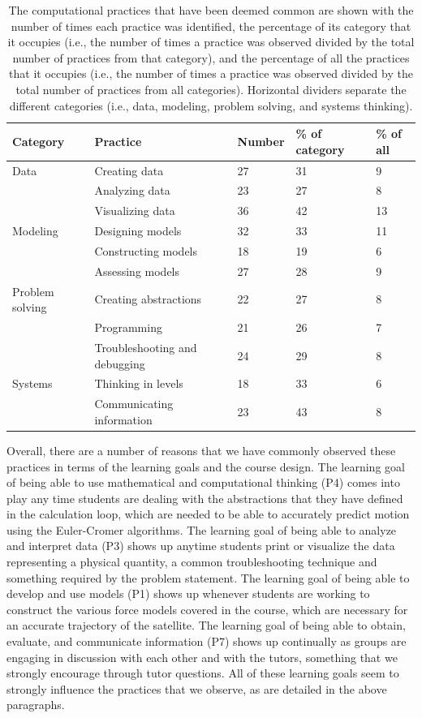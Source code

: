\documentclass{msuphddissertation}
\begin{document}
\begin{doublespace}
\begin{table}[hb]\centering
\begin{tabular}{lllll}\hline\hline
Category & Practice & Number & \% of category & \% of all\\\hline
Data & Creating data & 27 & 31 & 9 \\
 & Analyzing data & 23 & 27 & 8 \\
 & Visualizing data & 36 & 42 & 13 \\\hline
Modeling & Designing models & 32 & 33 & 11 \\
 & Constructing models & 18 & 19 & 6 \\
 & Assessing models & 27 & 28 & 9\\\hline
Problem solving & Creating abstractions & 22 & 27 & 8 \\
 & Programming & 21 & 26 & 7 \\
 & Troubleshooting and debugging & 24 & 29 & 8 \\\hline
Systems & Thinking in levels & 18 & 33 & 6 \\
 & Communicating information & 23 & 43 & 8 \\\hline\hline
\end{tabular}
\caption{The computational practices that have been deemed common are shown with the number of times each practice was identified, the percentage of its category that it occupies (i.e., the number of times a practice was observed divided by the total number of practices from that category), and the percentage of all the practices that it occupies (i.e., the number of times a practice was observed divided by the total number of practices from all categories).  Horizontal dividers separate the different categories (i.e., data, modeling, problem solving, and systems thinking).}\label{CH6:Common}
\end{table}

Overall, there are a number of reasons that we have commonly observed these practices in terms of the learning goals and the course design.  The learning goal of being able to use mathematical and computational thinking (P4) comes into play any time students are dealing with the abstractions that they have defined in the calculation loop, which are needed to be able to accurately predict motion using the Euler-Cromer algorithms.  The learning goal of being able to analyze and interpret data (P3) shows up anytime students print or visualize the data representing a physical quantity, a common troubleshooting technique and something required by the problem statement.  The learning goal of being able to develop and use models (P1) shows up whenever students are working to construct the various force models covered in the course, which are necessary for an accurate trajectory of the satellite.  The learning goal of being able to obtain, evaluate, and communicate information (P7) shows up continually as groups are engaging in discussion with each other and with the tutors, something that we strongly encourage through tutor questions.  All of these learning goals seem to strongly influence the practices that we observe, as are detailed in the above paragraphs.


\end{doublespace}
\end{document}
